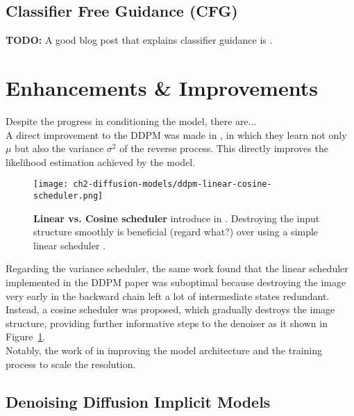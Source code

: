     
\subsection{Classifier Free Guidance (CFG)}

    \textbf{TODO:} A good blog post that explains classifier guidance is \cite{dieleman2022guidance}. \\


\section{Enhancements \& Improvements}

Despite the progress in conditioning the model, there are...\\

A direct improvement to the DDPM was made in \cite{nichol2021improved}, in which they learn not only $\mu$ but also the variance $\sigma^{2}$ of the reverse process. This directly improves the likelihood estimation achieved by the model. \\

\begin{figure}[ht]
    \centering
    \texttt{[image: ch2-diffusion-models/ddpm-linear-cosine-scheduler.png]}
    \captionsetup{width=\textwidth} %
    \caption{\textbf{Linear vs. Cosine scheduler} introduce in \cite{nichol2021improved}. Destroying the input structure smoothly is beneficial (regard what?) over using a simple linear scheduler .}
    \label{fig:ddpm-linear-vs-cosine-scheduler}
  \end{figure}

Regarding the variance scheduler, the same work found that the linear scheduler implemented in the DDPM paper was suboptimal because destroying the image very early in the backward chain left a lot of intermediate states redundant. Instead, a cosine scheduler was proposed, which gradually destroys the image structure, providing further informative steps to the denoiser as it shown in Figure~\ref{fig:ddpm-linear-vs-cosine-scheduler}. \\

Notably, the work of \cite{rombach2022highresolution} in improving the model architecture and the training process to scale the resolution.

\subsection{Denoising Diffusion Implicit Models}

